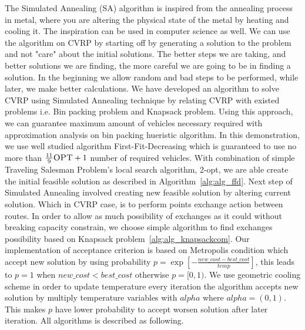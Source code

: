 \documentclass[12pt]{article}
\begin{document}
The Simulated Annealing (SA) algorithm is inspired from the annealing process in metal, where you are altering the physical state of the metal 
by heating and cooling it. The inspiration can be used in computer science as well. We can use the algorithm on CVRP by starting off by generating a solution 
to the problem and not "care" about the initial solutions. The better steps we are taking, and better solutions we are finding, the more careful we are going to be in finding 
a solution. In the beginning we allow random and bad steps to be performed, while later, we make better calculations.
\newline
We have developed an algorithm to solve CVRP using Simulated Annealing technique by relating CVRP with existed problems i.e. Bin packing problem and Knapsack problem. Using this approach, we can guarantee maximum amount of vehicles necessary required with approximation analysis on bin packing hueristic algorithm. In this demonstration, we use well studied  algorithm First-Fit-Decreasing which is guaranteed to use no more than $\frac{11}{9}\textsc{OPT} + 1$ number of required vehicles\cite{FFD}. With combination of simple Traveling Salesman Problem's local search algorithm, 2-opt, we are able create the initial feasible solution as described in Algorithm~\ref{alg:alg_ffd}. Next step of Simulated Annealing involved creating new feasible solution by altering current solution. Which in CVRP case, is to perform points exchange action between routes. In order to allow as much possibility of exchanges as it could without breaking capacity constrain, we choose simple algorithm to find exchanges possibility based on Knapsack problem~\ref{alg:alg_knapsackcom}. Our implementation of acceptance criterion is based on Metropolis condition which accept new solution by using probability $p = \exp[−\frac{new\_cost − best\_cost}{temp}]$, this leads to $p = 1$ when $new\_cost < best\_cost$ otherwise $p = [0,1)$. We use geometric cooling scheme in order to update temperature every iteration the algorithm accepts new solution by multiply temperature variables with $alpha$ where  $alpha=(0,1)$. This makes $p$ have lower probability to accept worsen solution after later iteration. All algorithms is described as following.
\end{document}

